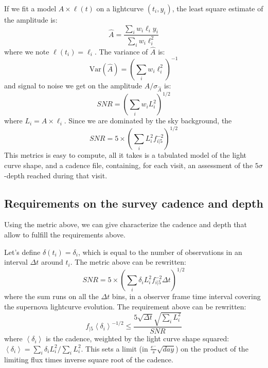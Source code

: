 \documentclass[\docopts]{\docclass}
\begin{document}
If we fit a model $A \times \ell(t)$ on a lightcurve $(t_i, y_i)$, the
least square estimate of the amplitude is:
\begin{equation}
  \hat{A} = \frac{\sum_i w_i \ell_i y_i}{\sum_i w_i \ell^2_i}
\end{equation}
where we note $\ell(t_i) = \ell_i$. The  variance of $\hat{A}$ is:
\begin{equation}
  \mathrm{Var}(\hat{A}) = \left(\sum_i w_i \ell^2_i\right)^{-1}
\end{equation}
and signal to noise we get on the amplitude $\hat{A} /
\sigma_{\hat{A}}$ is:
\begin{equation}
  SNR = \left(\sum_i w_i L^2_i\right)^{1/2}
\end{equation}
where $L_i = A \times \ell_i$. Since we are dominated by the sky
background, the
\begin{equation}
  SNR = 5 \times \left(\sum_i L^2_i f^{-2}_{i|5}\right)^{1/2}
\end{equation}
This metrics is easy to compute, all it takes is a tabulated model of
the light curve shape, and a cadence file, containing, for each visit,
an assessment of the $5\sigma$-depth reached during that visit. 


\subsection{Requirements on the survey cadence and depth}

Using the metric above, we can give characterize the cadence and depth
that allow to fulfill the requirements above. 

Let's define $\delta(t_i) = \delta_i$, which is equal to the number of
observations in an interval $\Delta t$ around $t_i$. The metric above
can be rewritten:
\begin{equation}
  SNR = 5 \times \left(\sum_i \delta_i L^2_i f^{-2}_{i|5} \Delta t\right)^{1/2}
\end{equation}
where the sum runs on all the $\Delta t$ bins, in a observer frame
time interval covering the supernova lightcurve evolution. The requirement 
above can be rewritten:
\begin{equation}
  f_{|5} \left<\delta_i\right>^{-1/2} \leq \frac{5 \sqrt{\Delta t} \sqrt{\sum_i L_i^2}}{SNR}
  \label{eqn:global_metric}
\end{equation}
where $\left<\delta_i\right>$ is the cadence, weighted by the light
curve shape squared: $\left<\delta_i\right> = \sum_i \delta_i
L_i^2/\sum_i L_i^2$.  This sets a limit (in $\frac{e^-}{s}
\sqrt{day}$) on the product of the limiting flux times inverse square
root of the cadence.
\end{document}
